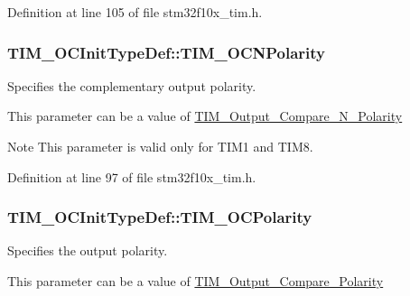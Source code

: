 Definition at line 105 of file stm32f10x\-\_\-tim.\-h.

\hypertarget{struct_t_i_m___o_c_init_type_def_a3e47e672810747302c9d0626ae2ccb17}{
\subsubsection[{T\-I\-M\-\_\-\-O\-C\-N\-Polarity}]{ T\-I\-M\-\_\-\-O\-C\-Init\-Type\-Def\-::\-T\-I\-M\-\_\-\-O\-C\-N\-Polarity}}\label{struct_t_i_m___o_c_init_type_def_a3e47e672810747302c9d0626ae2ccb17}
\begin{DoxyVerb}   Specifies the complementary output polarity.
\end{DoxyVerb}
 This parameter can be a value of \hyperlink{group___t_i_m___output___compare___n___polarity}{T\-I\-M\-\_\-\-Output\-\_\-\-Compare\-\_\-\-N\-\_\-\-Polarity} \begin{DoxyNote}{Note}
This parameter is valid only for T\-I\-M1 and T\-I\-M8. 
\end{DoxyNote}


Definition at line 97 of file stm32f10x\-\_\-tim.\-h.

\hypertarget{struct_t_i_m___o_c_init_type_def_a9ed3e2de4700d008729a916d8ba78486}{
\subsubsection[{T\-I\-M\-\_\-\-O\-C\-Polarity}]{ T\-I\-M\-\_\-\-O\-C\-Init\-Type\-Def\-::\-T\-I\-M\-\_\-\-O\-C\-Polarity}}\label{struct_t_i_m___o_c_init_type_def_a9ed3e2de4700d008729a916d8ba78486}
\begin{DoxyVerb}    Specifies the output polarity.
\end{DoxyVerb}
 This parameter can be a value of \hyperlink{group___t_i_m___output___compare___polarity}{T\-I\-M\-\_\-\-Output\-\_\-\-Compare\-\_\-\-Polarity} 

